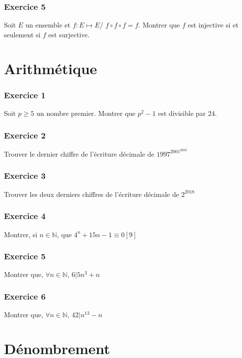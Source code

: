 \documentclass[11pt]{article}
\begin{document}
\section*{Exercice 5}

Soit $E$ un ensemble et $f:E\mapsto E$/ $f\circ f\circ f=f$. Montrer que $f$ est injective si et seulement si $f$ est surjective.

\part*{Arithmétique}

\section*{Exercice 1}

Soit $p\geq 5$ un nombre premier. Montrer que $p^2 -1$ est divisible par 24.

\section*{Exercice 2}

Trouver le dernier chiffre de l'écriture décimale de $1997^{2001^{2003}}$

\section*{Exercice 3}

Trouver les deux derniers chiffres de l'écriture décimale de $2^{2018}$

\section*{Exercice 4}

Montrer, si $n\in\mathbb{N}$, que $4^n +15n -1\equiv 0[9]$

\section*{Exercice 5}

Montrer que, $\forall n\in\mathbb{N}$, $6|5n^3+n$

\section*{Exercice 6}

Montrer que, $\forall n\in\mathbb{N}$, $42|n^{13}-n$

\part*{Dénombrement}
\end{document}
